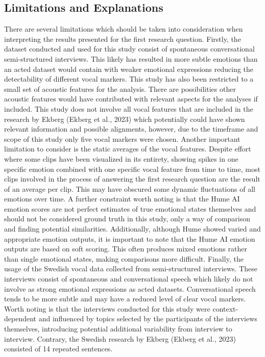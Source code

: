 \subsection{Limitations and Explanations}
There are several limitations which should be taken into consideration when interpreting the results presented for the first research question. 
Firstly, the dataset conducted and used for this study consist of spontaneous conversational semi-structured interviews. This likely has resulted in more subtle emotions than an acted dataset would contain with weaker emotional expressions reducing the detectability of different vocal markers. 
This study has also been restricted to a small set of acoustic features for the analysis. There are possibilities other acoustic features would have contributed with relevant aspects for the analyses if included. This study does not involve all vocal features that are included in the research by Ekberg (Ekberg et al., 2023) which potentially could have shown relevant information and possible alignments, however, due to the timeframe and scope of this study only five vocal markers were chosen.
Another important limitation to consider is the static averages of the vocal features. Despite effort where some clips have been visualized in its entirety, showing spikes in one specific emotion combined with one specific vocal feature from time to time, most clips involved in the process of answering the first research question are the result of an average per clip. This may have obscured some dynamic fluctuations of all emotions over time.
A further constraint worth noting is that the Hume AI emotion scores are not perfect estimates of true emotional states themselves and should not be considered ground truth in this study, only a way of comparison and finding potential similarities. Additionally, although Hume showed varied and appropriate emotion outputs, it is important to note that the Hume AI emotion outputs are based on soft scoring. This often produces mixed emotions rather than single emotional states, making comparisons more difficult.
Finally, the usage of the Swedish vocal data collected from semi-structured interviews. These interviews consist of spontaneous and conversational speech which likely do not involve as strong emotional expressions as acted datasets. Conversational speech tends to be more subtle and may have a reduced level of clear vocal markers. 
Worth noting is that the interviews conducted for this study were context-dependent and influenced by topics selected by the participants of the interviews themselves, introducing potential additional variability from interview to interview. Contrary, the Swedish research by Ekberg (Ekberg et al., 2023) consisted of 14 repeated sentences.

